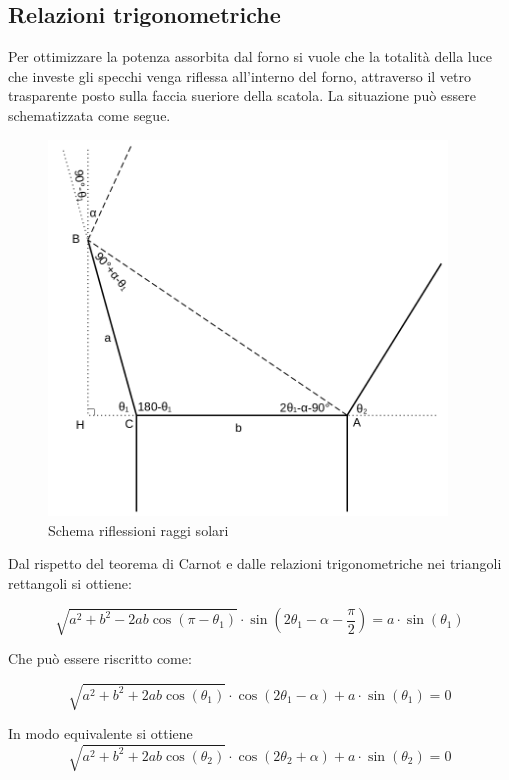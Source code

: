 \documentclass[12pt]{article}
\begin{document}
    
    \subsection{Relazioni trigonometriche}
    Per ottimizzare la potenza assorbita dal forno si vuole che la totalità della luce che investe gli specchi venga riflessa all'interno del forno, attraverso il vetro trasparente posto sulla faccia sueriore della scatola. La situazione può essere schematizzata come segue.

    \begin{figure}[h]
    \centering
        \includegraphics[width=300pt]{Draws/Reflection_schematics_trig.png}
        \caption{Schema riflessioni raggi solari}
    \end{figure}
    
    \noindent
    Dal rispetto del teorema di Carnot e dalle relazioni trigonometriche nei triangoli rettangoli si ottiene:
    
    \begin{equation}
        \sqrt{a^2 + b^2 - 2 a b \cos(\pi-\theta_1)}  \cdot \sin \left(2 \theta_1 - \alpha - \frac{\pi}{2} \right) = a \cdot \sin(\theta_1)
    \end{equation}

    \noindent
    Che può essere riscritto come:
    
    \begin{equation}
        \sqrt{a^2 + b^2 + 2 a b \cos(\theta_1)}  \cdot \cos(2 \theta_1 - \alpha) + a \cdot \sin(\theta_1) = 0
    \end{equation}
    
    \noindent
    In modo equivalente si ottiene
    \begin{equation}
        \sqrt{a^2 + b^2 + 2 a b \cos(\theta_2)}  \cdot \cos(2 \theta_2 + \alpha) + a \cdot \sin(\theta_2) = 0
    \end{equation}
    
\end{document}
